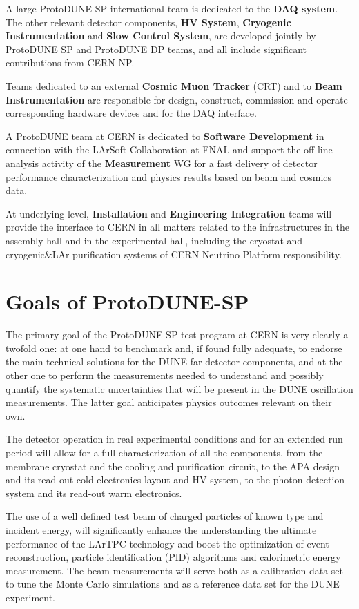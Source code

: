 A large ProtoDUNE-SP international team is dedicated to the {\bf DAQ system}. 
The other relevant detector components,  {\bf HV System},  {\bf Cryogenic Instrumentation} and {\bf Slow Control System}, are developed jointly by ProtoDUNE SP and ProtoDUNE DP teams, and all include significant contributions from CERN NP.

Teams dedicated to an external {\bf Cosmic Muon Tracker} (CRT) and to {\bf Beam Instrumentation} are responsible for design, construct, commission and operate corresponding hardware devices and for the DAQ interface.

A ProtoDUNE team at CERN is dedicated to {\bf Software Development} in connection with the LArSoft Collaboration at FNAL and support the off-line analysis activity of the {\bf Measurement} WG for a fast delivery of detector performance characterization and physics results based on beam and cosmics data.

At underlying level, {\bf Installation} and {\bf Engineering Integration} teams will provide the interface to CERN in all matters related to the infrastructures in the assembly hall and in the experimental hall, including the cryostat and cryogenic\&LAr purification systems of CERN Neutrino Platform responsibility.

\section{Goals of ProtoDUNE-SP}
The primary goal of the ProtoDUNE-SP test program at CERN is very clearly a twofold one: at one hand to benchmark and, if found fully adequate, to endorse the main technical solutions for the DUNE far detector components, and at the other one to perform the measurements needed to understand and possibly quantify the systematic uncertainties that will be present in the DUNE oscillation measurements. The latter goal anticipates physics outcomes relevant on their own.

The detector operation in real experimental conditions and for an extended run period will allow for a full characterization of all 
the components, from the membrane cryostat and the cooling and purification circuit, to the APA design and its read-out cold electronics layout and HV system, to the photon detection system and its read-out warm electronics.

The use of a well defined test beam of charged particles of known type and incident  energy, will significantly enhance the understanding the ultimate performance of the LArTPC technology and boost the optimization of event reconstruction, particle identification (PID) algorithms and calorimetric energy measurement.  The beam measurements will serve both as a calibration data set to tune the Monte Carlo simulations and as a reference data set for the DUNE experiment. 

